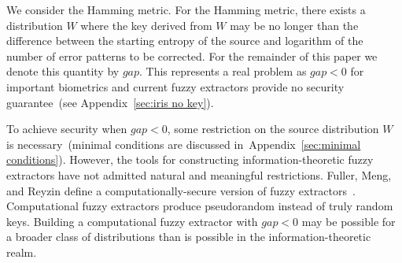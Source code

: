 \documentclass[11pt]{article}
\newcommand{\apref}[1]{\mbox{Appendix~\ref{#1}}}
\newcommand{\Hoo}{\mathrm{H}_\infty}
\begin{document}
We consider the Hamming metric.  For the Hamming metric, there exists a distribution $W$ where the key derived from $W$ may be no longer than the difference between the starting entropy of the source and logarithm of the number of error patterns to be corrected. For the remainder of this paper we denote this quantity by $gap$.  This represents a real problem as $gap<0$ for important biometrics and current fuzzy extractors provide no security guarantee~(see \apref{sec:iris no key}).


To achieve security when $gap<0$, some restriction on the source distribution $W$ is necessary~(minimal conditions are discussed in~\apref{sec:minimal conditions}).  However, the tools for constructing information-theoretic fuzzy extractors have not admitted natural and meaningful restrictions.  Fuller, Meng, and Reyzin define a computationally-secure version of fuzzy extractors~\cite{fuller2013computational}.  Computational fuzzy extractors produce pseudorandom instead of truly random keys.  Building a computational fuzzy extractor with $gap<0$ may be possible for a broader class of distributions than is possible in the information-theoretic realm.  
\end{document}
